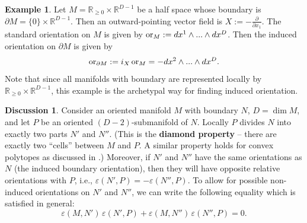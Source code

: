 \documentclass{elsarticle}
\theoremstyle{definition}
\newtheorem{discussion}[theorem]{Discussion}
\newtheorem{example}[theorem]{Example}
\newcommand{\OR}{\mathop{\rm or}\nolimits}
\newcommand{\R}{\mathbb{R}}
\newcommand{\newterm}[1]{\textbf{#1}}
\begin{document}
\begin{example}
  \label{ex:exterior_calculus/half_space_boundary_orientation}
  Let $M = \R_{\geq 0} \times \R^{D - 1}$ be a half space whose boundary is
  $\partial M = \{0\} \times \R^{D - 1}$.
  Then an outward-pointing vector field is
  $X := - \frac{\partial}{\partial x_1}$.
  The standard orientation on $M$ is given by
  $\OR_M := d x^1 \wedge ... \wedge d x^D$.
  Then the induced orientation on $\partial M$ is given by
  \begin{equation}
    \OR_{\partial M}
    := i_{X} \OR_M
    = - dx^2 \wedge ... \wedge dx^D.
  \end{equation}
  Note that since all manifolds with boundary are represented locally by
  $\R_{\geq 0} \times \R^{D - 1}$,
  this example is the archetypal way for finding induced orientation.
\end{example}
\begin{discussion}
  \label{dsc:exterior_calculus/diamond_property}
  Consider an oriented manifold $M$ with boundary $N$, $D = \dim M$, and let $P$ be an oriented $(D - 2)$-submanifold of $N$.
  Locally $P$ divides $N$ into exactly two parts $N'$ and $N''$.
  (This is the \newterm{diamond property} -- there are exactly two ``cells'' between $M$ and $P$.
  A similar property holds for convex polytopes as discussed in \cite[Theorem 2.7 (iii)]{ziegler1995lectures}.)
  Moreover, if $N'$ and $N''$ have the same orientations as $N$ (the induced boundary orientation),
  then they will have opposite relative orientations with $P$, i.e.,
  $\varepsilon(N', P) = - \varepsilon(N'', P)$.
  To allow for possible non-induced orientations on $N'$ and $N''$, we can write the following equality \cite[Supplementary matrial, Proposition Appendix B.13]{berbatov2022diffusion} which is satisfied in general:
  \begin{equation}
    \label{eq:exterior_calculus/chain_complex_property}
    \varepsilon(M, N')\, \varepsilon(N', P) + \varepsilon(M, N'')\, \varepsilon(N'', P) = 0.
  \end{equation}
\end{discussion}
\end{document}

